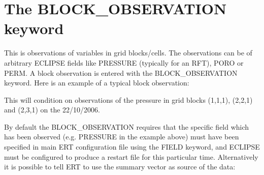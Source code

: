 \documentclass[a4paper,10pt,english]{sphinxmanual}
\begin{document}
\section{The BLOCK\_OBSERVATION keyword}
\label{\detokenize{observations/index:the-block-observation-keyword}}
This is observations of variables in grid blocks/cells. The
observations can be of arbitrary ECLIPSE fields like PRESSURE
(typically for an RFT), PORO or PERM. A block observation is entered
with the BLOCK\_OBSERVATION keyword. Here is an example of a typical
block observation:

%
\begin{sphinxVerbatim}[commandchars=\\\{\}]
 
     
      

                          
                          
                          
\end{sphinxVerbatim}

This will condition on observations of the pressure in grid blocks
(1,1,1), (2,2,1) and (2,3,1) on the 22/10/2006.

By default the BLOCK\_OBSERVATION requires that the specific field
which has been observed (e.g. PRESSURE in the example above) must have
been specified in main ERT configuration file using the FIELD keyword,
and ECLIPSE must be configured to produce a restart file for this
particular time. Alternatively it is possible to tell ERT to use the
summary vector as source of the data:
\end{document}
